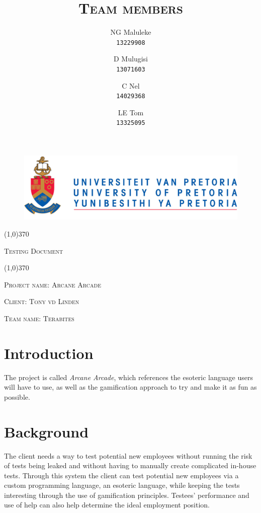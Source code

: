 \documentclass[english]{article}
\title{\scshape\Large Team members}
\author{
	NG Maluleke\\
	\texttt{13229908}
	\and
	D Mulugisi\\
	\texttt{13071603}
	\and
	C Nel\\
	\texttt{14029368}
	\and
	LE Tom\\
	\texttt{13325095}
}
\begin{document}
	
	\begin{figure}
		\includegraphics[width=\linewidth]{up_logo.png}
	\end{figure}
	
	\begin{center}
	 \line(1,0){370}
	\\[0.2cm]
    {\scshape\Large Testing Document \par}
	\vspace{0.1cm}
	\line(1,0){370}
	\\[0.8cm]
	
	{\scshape\large Project name: Arcane Arcade\par}	
	\vspace{1cm}
	{\scshape\large Client: Tony vd Linden\par}
	\vspace{1cm}
	{\scshape\large Team name: Terabites\par}
	\vspace{1cm}
	{\let\newpage\relax\maketitle}
	\end{center}
	
	
	\newpage
	\tableofcontents

	\newpage
	
	\section{Introduction}
		 The project is called \textit{Arcane Arcade}, which references the esoteric language users will have to use, as well as the gamification approach to try and make it as fun as possible.

	\section{Background}
		The client needs a way to test potential new employees without running the risk of tests being leaked and without having to manually create complicated in-house tests. Through this system the client can test potential
		new employees via a custom programming language, an esoteric language, while keeping the tests interesting through the use of gamification principles. Testees' performance and use of help can also help determine the
		ideal employment position.
		
\end{document}
